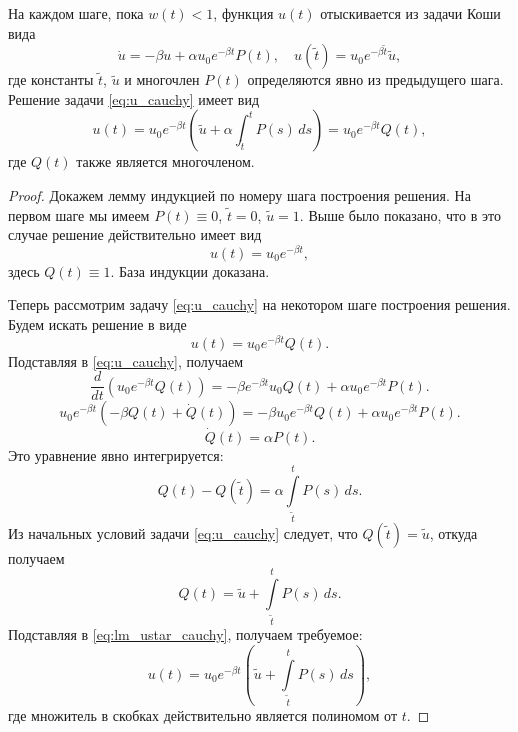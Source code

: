 \begin{lemma}
	\label{lm:u_star}
	На каждом шаге, пока $w(t) < 1$, функция $u(t)$ отыскивается из задачи Коши вида 
	\begin{equation}
		\label{eq:u_cauchy}
		\dot{u}=-\beta u + \alpha u_0 e^{-\beta t} P(t),\quad u(\tilde{t})=u_0 e^{-\beta \tilde{t}}\tilde{u},
	\end{equation}
	где константы $\tilde{t}$, $\tilde{u}$ и многочлен $P(t)$ определяются явно из предыдущего шага.
	Решение задачи \eqref{eq:u_cauchy} имеет вид
	\begin{equation}
		\label{eq:u_cauchy_sol}
		u(t) = u_0 e^{-\beta t}(\tilde{u}+\alpha \int_{\tilde{t}}^{t} P(s)\,ds) = u_0 e^{-\beta t} Q(t),
	\end{equation}
	где $Q(t)$ также является многочленом.
\end{lemma}

\begin{proof}
	Докажем лемму индукцией по номеру шага построения решения. На первом шаге мы имеем $P(t) \equiv 0$, $\tilde{t} = 0$, $\tilde u = 1$. Выше было показано, что в это случае решение действительно имеет вид
	\begin{equation*}
		u(t) = u_0 e^{-\beta t},
	\end{equation*}
	здесь $Q(t) \equiv 1$. База индукции доказана.
	
	Теперь рассмотрим задачу \eqref{eq:u_cauchy} на некотором шаге построения решения. Будем искать решение в виде
	\begin{equation}
		\label{eq:lm_ustar_cauchy}
		u(t) = u_0 e^{-\beta t} Q(t).
	\end{equation}
	Подставляя в \eqref{eq:u_cauchy}, получаем
	\begin{equation*}
		\frac{d}{dt}\left(u_0 e^{-\beta t} Q(t)\right) = -\beta e^{-\beta t} u_0 Q(t) + \alpha u_0 e^{-\beta t} P(t). 
	\end{equation*}
	\begin{equation*}
		u_0 e^{-\beta t} (-\beta Q(t) + \dot{Q}(t)) = -\beta u_0 e^{-\beta t} Q(t) + \alpha u_0 e^{-\beta t} P(t).
	\end{equation*}
	\begin{equation*}
		\dot{Q}(t) = \alpha P(t).
	\end{equation*}
	Это уравнение явно интегрируется:
	\begin{equation*}
		Q(t) - Q(\tilde{t}) = \alpha \int\limits_{\tilde{t}}^t P(s)\,ds.
	\end{equation*}
	Из начальных условий задачи \eqref{eq:u_cauchy} следует, что $Q(\tilde{t}) = \tilde{u}$, откуда получаем
	\begin{equation*}
		Q(t) = \tilde{u} + \int\limits_{\tilde{t}}^t P(s)\,ds.
	\end{equation*}
	Подставляя в \eqref{eq:lm_ustar_cauchy}, получаем требуемое:
	\begin{equation*}
		u(t) = u_0 e^{-\beta t} \left(\tilde{u} + \int\limits_{\tilde{t}}^t P(s)\,ds\right),
	\end{equation*}
	где множитель в скобках действительно является полиномом от $t$.
\end{proof}

